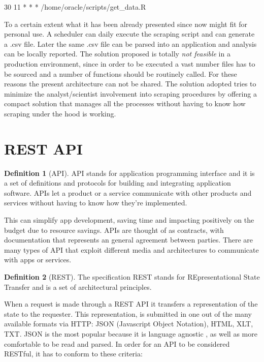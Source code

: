 \documentclass[
  12pt,
  a4paper,
  oneside]{book}
\theoremstyle{definition}
\newtheorem{definition}{Definition}[chapter]
\theoremstyle{definition}
\theoremstyle{definition}
\theoremstyle{remark}
\begin{document}
30 11 * * * /home/oracle/scripts/get\_data.R

To a certain extent what it has been already presented since now might fit for personal use. A scheduler can daily execute the scraping script and can generate a .csv file. Later the same .csv file can be parsed into an application and analysis can be locally reported. The solution proposed is totally \emph{not feasible} in a production environment, since in order to be executed a vast number files has to be sourced and a number of functions should be routinely called. For these reasons the present architecture can not be shared. The solution adopted tries to minimize the analyst/scientist involvement into scraping procedures by offering a compact solution that manages all the processes without having to know how scraping under the hood is working.

\hypertarget{rest-api}{%
\section{REST API}\label{rest-api}}

\begin{definition}[API]
\protect\hypertarget{def:api}{}{\label{def:api} {} }API stands for application programming interface and it is a set of definitions and protocols for building and integrating application software. APIs let a product or a service communicate with other products and services without having to know how they're implemented.
\end{definition}
This can simplify app development, saving time and impacting positively on the budget due to resource savings. APIs are thought of as contracts, with documentation that represents an general agreement between parties.
There are many types of API that exploit different media and architectures to communicate with apps or services.
\begin{definition}[REST]
\protect\hypertarget{def:rest}{}{\label{def:rest} {} }The specification REST stands for REpresentational State Transfer and is a set of architectural principles.
\end{definition}
When a request is made through a REST API it transfers a representation of the state to the requester. This representation, is submitted in one out of the many available formats via HTTP: JSON (Javascript Object Notation), HTML, XLT, TXT. JSON is the most popular because it is language agnostic \citep{what_is_a_rest_api}, as well as more comfortable to be read and parsed.
In order for an API to be considered RESTful, it has to conform to these criteria:
\end{document}
